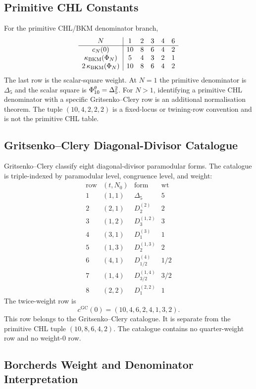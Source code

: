 \subsection*{Primitive CHL Constants}

For the primitive CHL/BKM denominator branch,
\[
\begin{array}{c|ccccc}
N & 1 & 2 & 3 & 4 & 6 \\ \hline
c_N(0) & 10 & 8 & 6 & 4 & 2 \\
\kappa_{\mathrm{BKM}}(\Phi_N) & 5 & 4 & 3 & 2 & 1 \\
2\,\kappa_{\mathrm{BKM}}(\Phi_N) & 10 & 8 & 6 & 4 & 2
\end{array}
\]
The last row is the scalar-square weight. At $N=1$ the primitive
denominator is $\Delta_5$ and the scalar square is
$\Phi_{10}^\theta=\Delta_5^2$. For $N>1$, identifying a primitive CHL
denominator with a specific Gritsenko--Clery row is an additional
normalisation theorem. The tuple $(10,4,2,2,2)$ is a fixed-locus or
twining-row convention and is not the primitive CHL table.

\subsection*{Gritsenko--Clery Diagonal-Divisor Catalogue}

Gritsenko--Clery classify eight diagonal-divisor paramodular forms. The
catalogue is triple-indexed by paramodular level, congruence level, and
weight:
\[
\begin{array}{c|c|c|c}
\text{row} & (t,N_0) & \text{form} & \mathrm{wt} \\
\hline
1 & (1,1) & \Delta_5 & 5 \\
2 & (2,1) & D_2^{(2)} & 2 \\
3 & (1,2) & D_3^{(1,2)} & 3 \\
4 & (3,1) & D_1^{(3)} & 1 \\
5 & (1,3) & D_2^{(1,3)} & 2 \\
6 & (4,1) & D_{1/2}^{(4)} & 1/2 \\
7 & (1,4) & D_{3/2}^{(1,4)} & 3/2 \\
8 & (2,2) & D_1^{(2,2)} & 1
\end{array}
\]
The twice-weight row is
\[
  c^{\mathrm{GC}}(0)=(10,4,6,2,4,1,3,2).
\]
This row belongs to the Gritsenko--Clery catalogue. It is separate from
the primitive CHL tuple $(10,8,6,4,2)$. The catalogue contains no
quarter-weight row and no weight-$0$ row.

\subsection*{Borcherds Weight and Denominator Interpretation}

